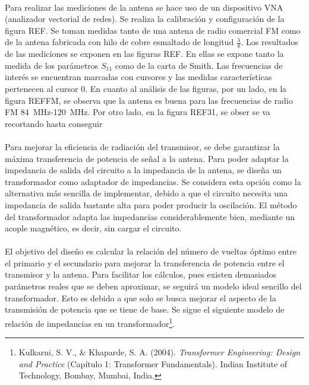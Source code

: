 \paragraph{}
Para realizar las mediciones de la antena se hace uso de un dispositivo VNA (analizador vectorial de redes). Se realiza la calibración y configuración de la figura REF. 
Se toman medidas tanto de una antena de radio comercial FM como de la antena fabricada con hilo de cobre esmaltado de longitud $\frac{\lambda}{8}$. 
Los resultados de las mediciones se exponen en las figuras REF. En ellas se expone tanto la medida de los par\'ametros $S_{11}$ como de la carta de Smith. Las frecuencias de inter\'es se encuentran marcadas con cursores y las medidas caracter\'isticas pertenecen al cursor 0. 
En cuanto al an\'alisis de las figuras, por un lado, en la figura REFFM, se observa que la antena es buena para las frecuencias de radio FM \SI{84}{\mega\hertz}-\SI{120}{\mega\hertz}. 
Por otro lado, en la figura REF31, se obser se va recortando hasta conseguir 
\paragraph{}
Para mejorar la eficiencia de radiación del transmisor, se debe garantizar la máxima transferencia de potencia de señal a la antena.
Para poder adaptar la impedancia de salida del circuito a la impedancia de la antena, se diseña un transformador como adaptador de impedancias. 
Se considera esta opción como la alternativa más sencilla de implementar, debido a que el circuito necesita una impedancia de salida bastante alta para poder producir la oscilación.
El método del transformador adapta las impedancias considerablemente bien, mediante un acople magnético, es decir, sin cargar el circuito.
\paragraph{}
El objetivo del diseño es calcular la relación del número de vueltas óptimo entre el primario y el secundario para mejorar la transferencia de potencia entre el transmisor y la antena. 
Para facilitar los cálculos, pues existen demasiados parámetros reales que se deben aproximar, se seguirá un modelo ideal sencillo del transformador. Esto es debido a que solo se busca mejorar el aspecto de la transmisión de potencia que se tiene de base.
Se sigue el siguiente modelo de relación de impedancias en un transformador\footnote{Kulkarni, S. V., \& Khaparde, S. A. (2004). \textit{Transformer Engineering: Design and Practice} (Capítulo 1: Transformer Fundamentals). Indian Institute of Technology, Bombay, Mumbai, India.}.

